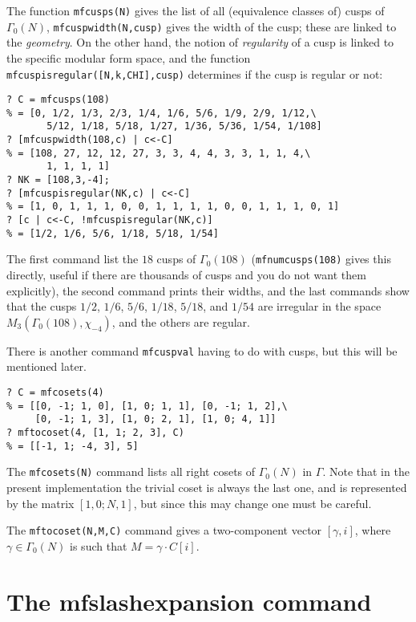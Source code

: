 \documentclass[11pt]{article}
\newcommand{\ga}{\gamma}
\newcommand{\G}{\Gamma}
\def\kbd#1{{\tt #1}}
\begin{document}
The function \kbd{mfcusps(N)} gives the list of all (equivalence classes of)
cusps of $\G_0(N)$, \kbd{mfcuspwidth(N,cusp)} gives the width of the cusp;
these are linked to the \emph{geometry}. On the other hand, the notion
of \emph{regularity} of a cusp is linked to the specific modular form space,
and the function \kbd{mfcuspisregular([N,k,CHI],cusp)} determines if the cusp
is regular or not:

\begin{verbatim}
? C = mfcusps(108)
% = [0, 1/2, 1/3, 2/3, 1/4, 1/6, 5/6, 1/9, 2/9, 1/12,\
       5/12, 1/18, 5/18, 1/27, 1/36, 5/36, 1/54, 1/108]
? [mfcuspwidth(108,c) | c<-C]
% = [108, 27, 12, 12, 27, 3, 3, 4, 4, 3, 3, 1, 1, 4,\
       1, 1, 1, 1]
? NK = [108,3,-4];
? [mfcuspisregular(NK,c) | c<-C]
% = [1, 0, 1, 1, 1, 0, 0, 1, 1, 1, 1, 0, 0, 1, 1, 1, 0, 1]
? [c | c<-C, !mfcuspisregular(NK,c)]
% = [1/2, 1/6, 5/6, 1/18, 5/18, 1/54]
\end{verbatim}

The first command list the $18$ cusps of $\G_0(108)$ (\kbd{mfnumcusps(108)}
gives this directly, useful if there are thousands of cusps and you do not
want them explicitly), the second command prints their widths, and the last
commands show that the cusps $1/2$, $1/6$, $5/6$, $1/18$, $5/18$, and $1/54$
are irregular in the space $M_3(\G_0(108),\chi_{-4})$, and the others are
regular.

There is another command \kbd{mfcuspval} having to do with cusps, but this
will be mentioned later.

\medskip

\begin{verbatim}
? C = mfcosets(4)
% = [[0, -1; 1, 0], [1, 0; 1, 1], [0, -1; 1, 2],\
     [0, -1; 1, 3], [1, 0; 2, 1], [1, 0; 4, 1]]
? mftocoset(4, [1, 1; 2, 3], C)
% = [[-1, 1; -4, 3], 5]
\end{verbatim}

The \kbd{mfcosets(N)} command lists all right cosets of $\G_0(N)$ in $\G$.
Note that in the present implementation the trivial coset is always the
last one, and is represented by the matrix $[1,0;N,1]$, but since this
may change one must be careful.

The \kbd{mftocoset(N,M,C)} command gives a two-component
vector $[\ga,i]$, where $\ga\in\G_0(N)$ is such that $M=\ga\cdot C[i]$.

\section{The mfslashexpansion command}
\end{document}
